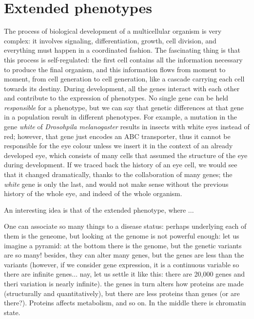 \documentclass[../main.tex]{subfiles}
\begin{document}
\section{Extended phenotypes}

The process of biological development of a multicellular organism is 
very complex: it involves signaling, differentiation, growth, cell 
division, and everything must happen in a coordinated fashion. The 
fascinating thing is that this process is self-regulated: the first cell 
contains all the information necessary to produce the final organism, 
and this information flows from moment to moment, from cell generation 
to cell generation, like a cascade carrying each cell towards its 
destiny. During development, all the genes interact with each other and 
contribute to the expression of phenotypes. No single gene can be held 
\textit{responsible} for a phenotype, but we can say that genetic 
differences at that gene in a population result in different phenotypes. 
For example, a mutation in the gene \textit{white} of \textit{Drosohpila 
melanogaster} results in insects with white eyes instead of red; 
however, that gene just encodes an ABC transporter, thus it cannot be 
responsible for the eye colour unless we insert it in the context of an 
already developed eye, which consists of many cells that assumed the 
structure of the eye during development. If we traced back the history 
of an eye cell, we would see that it changed dramatically, thanks to the 
collaboration of many genes; the \textit{white} gene is only the last, 
and would not make sense without the previous history of the whole eye, 
and indeed of the whole organism.

An interesting idea is that of the extended phenotype\cite{Dawkins1982}, 
where ...

One can associate so many things to a disease status: perhaps underlying 
each of them is the geneome, but looking at the genome is not powerful 
enough: let us imagine a pyramid: at the bottom there is the genome, but 
the genetic variants are so many! besides, they can alter many genes, 
but the genes are less than the variants (however, if we consider gene 
expression, it is a continuous variable so there are infinite genes... 
nay, let us settle it like this: there are 20,000 genes and theri 
variation is nearly infinite). the genes in turn alters how proteins are 
made (structurally and quantitatively), but there are less proteins than 
genes (or are there?). Proteins affects metabolism, and so on. In the 
middle there is chromatin state.
\end{document}
